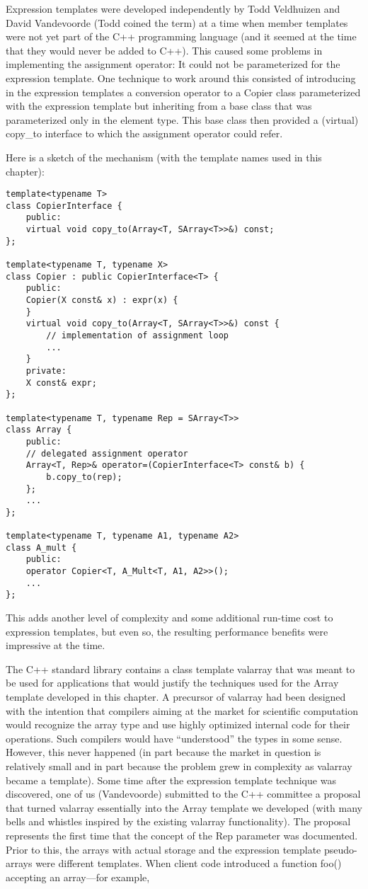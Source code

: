Expression templates were developed independently by Todd Veldhuizen and David Vandevoorde (Todd coined the term) at a time when member templates were not yet part of the C++ programming language (and it seemed at the time that they would never be added to C++). This caused some problems in implementing the assignment operator: It could not be parameterized for the expression template. One technique to work around this consisted of introducing in the expression templates a conversion operator to a Copier class parameterized with the expression template but inheriting from a base class that was parameterized only in the element  type. This base class then provided a (virtual) copy\_to interface to which the assignment operator could refer.

Here is a sketch of the mechanism (with the template names used in this chapter):

\begin{lstlisting}[style=styleCXX]
template<typename T>
class CopierInterface {
	public:
	virtual void copy_to(Array<T, SArray<T>>&) const;
};

template<typename T, typename X>
class Copier : public CopierInterface<T> {
	public:
	Copier(X const& x) : expr(x) {
	}
	virtual void copy_to(Array<T, SArray<T>>&) const {
		// implementation of assignment loop
		...
	}
	private:
	X const& expr;
};

template<typename T, typename Rep = SArray<T>>
class Array {
	public:
	// delegated assignment operator
	Array<T, Rep>& operator=(CopierInterface<T> const& b) {
		b.copy_to(rep);
	};
	...
};

template<typename T, typename A1, typename A2>
class A_mult {
	public:
	operator Copier<T, A_Mult<T, A1, A2>>();
	...
};
\end{lstlisting}

This adds another level of complexity and some additional run-time cost to expression templates, but even so, the resulting performance benefits were impressive at the time.

The C++ standard library contains a class template valarray that was meant to be used for applications that would justify the techniques used for the Array template developed in this chapter. A precursor of valarray had been designed with the intention that compilers aiming at the market for scientific computation would recognize the array type and use highly optimized internal code for their operations. Such compilers would have “understood” the types in some sense. However, this never happened (in part because the market in question is relatively small and in part because the problem grew in complexity as valarray became a template). Some time after the expression template technique was discovered, one of us (Vandevoorde) submitted to the C++ committee a proposal that turned valarray essentially into the Array template we developed (with many bells and whistles inspired by the existing valarray functionality). The proposal represents the first time that the concept of the Rep parameter was documented. Prior to this, the arrays with actual storage and the expression template pseudo-arrays were different templates. When client code introduced a function foo() accepting an array—for example,

